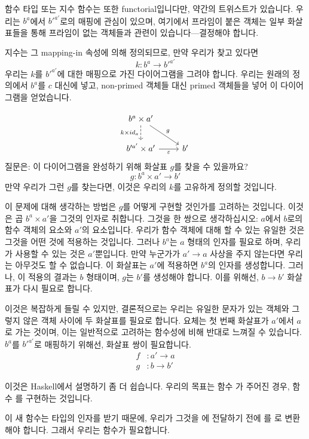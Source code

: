 \documentclass[DaoFP]{subfiles}
\begin{document}
\begin{CJK*}{UTF8}{gbsn}
함수 타입 또는 지수 함수는 또한 functorial입니다만, 약간의 트위스트가 있습니다. 우리는 $b^a$에서 $b'^{a'}$로의 매핑에 관심이 있으며, 여기에서 프라임이 붙은 객체는 일부 화살표들을 통해 프라임이 없는 객체들과 관련이 있습니다---결정해야 합니다.

지수는 그 mapping-in 속성에 의해 정의되므로, 만약 우리가 찾고 있다면
\[k \colon b^a \to b'^{a'} \]
우리는 $k$를 $b'^{a'}$에 대한 매핑으로 가진 다이어그램을 그려야 합니다. 우리는 원래의 정의에서 $b^a$를 $c$ 대신에 넣고, non-primed 객체들 대신 primed 객체들을 넣어 이 다이어그램을 얻었습니다.

\[
 \begin{tikzcd}
 b^a \times a'
 \arrow[d, dashed, "k \times id_a"']
 \arrow[rd, "g"]
 \\
 b'^{a'} \times a'
 \arrow[r, "\varepsilon"']
& b'
 \end{tikzcd}
\]
질문은: 이 다이어그램을 완성하기 위해 화살표 $g$를 찾을 수 있을까요?
\[g \colon b^a \times a' \to b'\]
만약 우리가 그런 $g$를 찾는다면, 이것은 우리의 $k$를 고유하게 정의할 것입니다.

이 문제에 대해 생각하는 방법은 $g$를 어떻게 구현할 것인가를 고려하는 것입니다. 이것은 곱 $b^a \times a'$을 그것의 인자로 취합니다. 그것을 한 쌍으로 생각하십시오: $a$에서 $b$로의 함수 객체의 요소와 $a'$의 요소입니다. 우리가 함수 객체에 대해 할 수 있는 유일한 것은 그것을 어떤 것에 적용하는 것입니다. 그러나 $b^a$는 $a$ 형태의 인자를 필요로 하며, 우리가 사용할 수 있는 것은 $a'$뿐입니다. 만약 누군가가 $a' \to a$ 사상을 주지 않는다면 우리는 아무것도 할 수 없습니다. 이 화살표는 $a'$에 적용하면 $b^a$의 인자를 생성합니다. 그러나, 이 적용의 결과는 $b$ 형태이며, $g$는 $b'$를 생성해야 합니다. 이를 위해선, $b \to b'$ 화살표가 다시 필요로 합니다.

이것은 복잡하게 들릴 수 있지만, 결론적으로는 우리는 유일한 문자가 있는 객체와 그렇지 않은 객체 사이에 두 화살표를 필요로 합니다. 요체는 첫 번째 화살표가 $a'$에서 $a$로 가는 것이며, 이는 일반적으로 고려하는 함수성에 비해 반대로 느껴질 수 있습니다. $b^a$를 $b'^{a'}$로 매핑하기 위해선, 화살표 쌍이 필요합니다.
\begin{align*}
f &\colon a' \to a \\
g &\colon b \to b' 
\end{align*}

이것은 Haskell에서 설명하기 좀 더 쉽습니다. 우리의 목표는 함수 가 주어진 경우, 함수 를 구현하는 것입니다.

이 새 함수는  타입의 인자를 받기 때문에, 우리가 그것을 에 전달하기 전에 를 로 변환해야 합니다. 그래서 우리는  함수가 필요합니다.


\end{CJK*}
\end{document}
